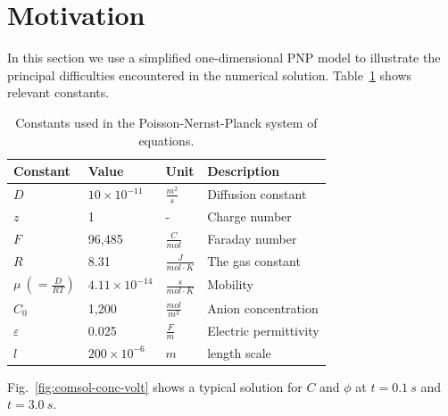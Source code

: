 \section{Motivation} \label{sec:moti}

In this section we use a simplified one-dimensional PNP model to illustrate the 
principal difficulties encountered in the numerical solution. Table~\ref{Table:used-constants} 
shows relevant constants.

\begin{table}[!ht]
\caption{Constants used in the Poisson-Nernst-Planck system of equations.}
\centering
\label{Table:used-constants}
{
\begin{tabular}{llll}
  \hline \hline
  Constant&Value&Unit&Description\\
  \hline
  $D$&$10\times10^{-11}$&$\frac{m^2}{s}$&Diffusion constant\\
  $z$&1&-&Charge number\\
  $F$&96,485&$\frac{C}{mol}$&Faraday number\\
  $R$&8.31&$\frac{J}{mol\cdot K}$&The gas constant\\
  $\mu\ \left( = \frac{D}{RT}\right)$&$4.11\times 10^{-14}$&$\frac{s}{mol\cdot K}$&Mobility\\
  $C_{0}$&1,200&$\frac{mol}{m^3}$&Anion concentration\\
  $\varepsilon$&0.025&$\frac{F}{m}$&Electric permittivity\\
  $l$&$200\times10^{-6}$&$m$& length scale\\
  \hline
  \hline
\end{tabular}
}
\end{table}

\noindent
Fig.~\ref{fig:comsol-conc-volt} shows a typical solution for $C$ and $\phi$
at $t=0.1\ s$ and $t=3.0\ s$. 

